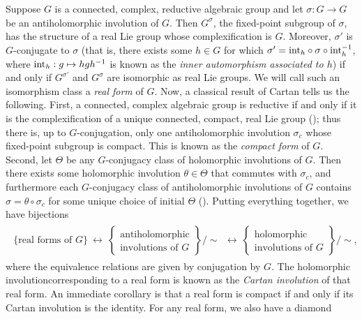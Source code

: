 \noindent\begin{remark}\label{CartanInvolution} Suppose $G$ is a connected, complex, reductive algebraic group and let $\sigma : G \to G$ be an antiholomorphic involution of $G$. Then $G^\sigma$, the fixed-point subgroup of $\sigma$, has the structure of a real Lie group whose complexification is $G$. Moreover, $\sigma'$ is $G$-conjugate to $\sigma$ (that is, there exists some $h \in G$ for which $\sigma' = \textnormal{int}_h\circ\sigma\circ\textnormal{int}_h^{-1}$, where $\textnormal{int}_h : g \mapsto hgh^{-1}$ is known as the {\em inner automorphism associated to $h$}) if and only if $G^{\sigma'}$ and $G^\sigma$ are isomorphic as real Lie groups. We will call such an isomorphism class a {\em real form} of $G$. Now, a classical result of Cartan tells us the following. First, a connected, complex algebraic group is reductive if and only if it is the complexification of a unique connected, compact, real Lie group (\cite[p.\ 34]{Kam11}); thus there is, up to $G$-conjugation, only one antiholomorphic involution $\sigma_c$ whose fixed-point subgroup is compact. This is known as the {\em compact form} of $G$. Second, let $\Theta$ be any $G$-conjugacy class of holomorphic involutions of $G$. Then there exists some holomorphic involution $\theta \in \Theta$ that commutes with $\sigma_c$, and furthermore each $G$-conjugacy class of antiholomorphic involutions of $G$ contains $\sigma = \theta \circ \sigma_c$ for some unique choice of initial $\Theta$ (\cite{Ada14}). Putting everything together, we have bijections
\begin{align*}
\begin{split}
\{\text{real forms of $G$}\}\ \longleftrightarrow\ \left\{\begin{matrix}\text{antiholomorphic}\\\text{involutions of $G$}\end{matrix}\right\}\!\big/\!\!\sim\ \ \longleftrightarrow\ \left\{\begin{matrix}\text{holomorphic}\\\text{involutions of $G$}\end{matrix}\right\}\!\big/\!\!\sim,
\end{split}
\end{align*}
\noindent where the equivalence relations are given by conjugation by $G$. The holomorphic involution\linebreak corresponding to a real form is known as the {\em Cartan involution} of that real form. An immediate corollary is that a real form is compact if and only if its Cartan involution is the identity. For any real form, we also have a diamond

\end{remark}
